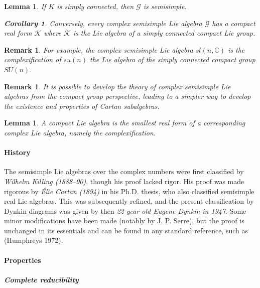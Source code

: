 \documentclass[aps,preprint]{revtex4}%
\newtheorem{corollary}[theorem]{Corollary}
\newtheorem{lemma}[theorem]{Lemma}
\newtheorem{remark}[theorem]{Remark}
\begin{document}
\begin{lemma}
If $K$ is \emph{simply connected}, then $\mathcal{G}$ is \emph{semisimple}.

\begin{corollary}
Conversely, every complex semisimple Lie algebra $\mathcal{G}$ has a compact
real form $\mathcal{K}$ where $\mathcal{K}$ is the Lie algebra of a simply
connected compact Lie group.
\end{corollary}
\end{lemma}

\begin{remark}
For example, the complex semisimple Lie algebra $sl\left(  n,\mathbb{C}%
\right)  $ is the complexification of $su\left(  n\right)  $ the Lie algebra
of the simply connected compact group $SU(n)$.
\end{remark}

\begin{remark}
It is possible to develop the theory of complex semisimple Lie algebras from
the compact group perspective, leading to a simpler way to develop the
existence and properties of Cartan subalgebras.
\end{remark}

\begin{lemma}
A compact Lie algebra is the smallest real form of a corresponding complex Lie
algebra, namely the complexification.
\end{lemma}

\paragraph{History}

The semisimple Lie algebras over the complex numbers were first classified by
\emph{Wilhelm Killing (1888--90)}, though his proof lacked rigor. His proof
was made rigorous by \emph{\'{E}lie Cartan (1894)} in his Ph.D. thesis, who
also classified semisimple real Lie algebras. This was subsequently refined,
and the present classification by Dynkin diagrams was given by then
\emph{22-year-old Eugene Dynkin in 1947}. Some minor modifications have been
made (notably by J. P. Serre), but the proof is unchanged in its essentials
and can be found in any standard reference, such as (Humphreys 1972).

\paragraph{Properties}

\subparagraph{Complete reducibility}
\end{document}
